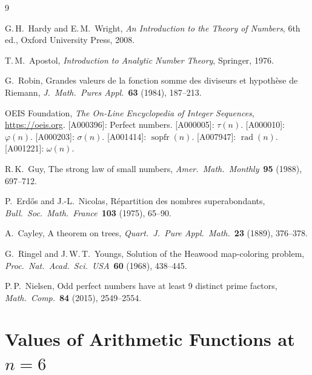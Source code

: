 \documentclass{article}
\newcommand{\rad}{\operatorname{rad}}
\newcommand{\sopfr}{\operatorname{sopfr}}
\begin{document}
\begin{thebibliography}{9}

G.\,H.~Hardy and E.\,M.~Wright, \emph{An Introduction to the Theory of Numbers}, 6th ed., Oxford University Press, 2008.

T.\,M.~Apostol, \emph{Introduction to Analytic Number Theory}, Springer, 1976.

G.~Robin, Grandes valeurs de la fonction somme des diviseurs et hypoth\`ese de Riemann, \emph{J.\ Math.\ Pures Appl.}\ \textbf{63} (1984), 187--213.

OEIS Foundation, \emph{The On-Line Encyclopedia of Integer Sequences}, \url{https://oeis.org}.
\textsf{[A000396]}: Perfect numbers.
\textsf{[A000005]}: $\tau(n)$.
\textsf{[A000010]}: $\varphi(n)$.
\textsf{[A000203]}: $\sigma(n)$.
\textsf{[A001414]}: $\sopfr(n)$.
\textsf{[A007947]}: $\rad(n)$.
\textsf{[A001221]}: $\omega(n)$.

R.\,K.~Guy, The strong law of small numbers, \emph{Amer.\ Math.\ Monthly}\ \textbf{95} (1988), 697--712.

P.~Erd\H{o}s and J.-L.~Nicolas, R\'epartition des nombres superabondants, \emph{Bull.\ Soc.\ Math.\ France}\ \textbf{103} (1975), 65--90.

A.~Cayley, A theorem on trees, \emph{Quart.\ J.\ Pure Appl.\ Math.}\ \textbf{23} (1889), 376--378.

G.~Ringel and J.\,W.\,T.~Youngs, Solution of the Heawood map-coloring problem, \emph{Proc.\ Nat.\ Acad.\ Sci.\ USA}\ \textbf{60} (1968), 438--445.

P.\,P.~Nielsen, Odd perfect numbers have at least 9 distinct prime factors, \emph{Math.\ Comp.}\ \textbf{84} (2015), 2549--2554.

\end{thebibliography}

\appendix

\section{Values of Arithmetic Functions at $n = 6$}
\end{document}
